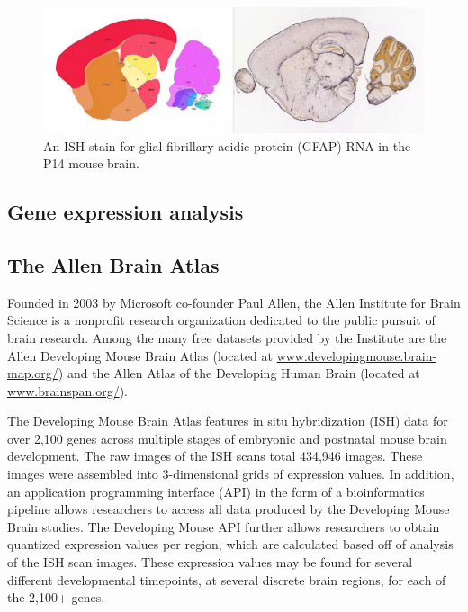 \documentclass[12pt,oneside,onecolumn,a4paper]{article}
\begin{document}
\begin{figure}[h!]
\begin{center}
\includegraphics[width=0.8\columnwidth]{figures/ISH/ISH}
\caption{An ISH stain for glial fibrillary acidic protein (GFAP) RNA in the P14 mouse brain.%
}
\end{center}
\end{figure}

\subsection{Gene expression analysis}


\subsection{The Allen Brain Atlas}
Founded in 2003 by Microsoft co-founder Paul Allen, the Allen Institute for Brain Science is a nonprofit research organization dedicated to the public pursuit of brain research. Among the many free datasets provided by the Institute are the Allen Developing Mouse Brain Atlas (located at \href{http://www.developingmouse.brain-map.org/}{www.developingmouse.brain-map.org/}) and the Allen Atlas of the Developing Human Brain (located at \href{http://www.brainspan.org/}{www.brainspan.org/}).

The Developing Mouse Brain Atlas features in situ hybridization (ISH) data for over 2,100 genes across multiple stages of embryonic and postnatal mouse brain development. The raw images of the ISH scans total 434,946 images. These images were assembled into 3-dimensional grids of expression values.  In addition, an application programming interface (API) in the form of a bioinformatics pipeline allows researchers to access all data produced by the Developing Mouse Brain studies. The Developing Mouse API further allows researchers to obtain quantized expression values per region, which are calculated based off of analysis of the ISH scan images. These expression values may be found for several different developmental timepoints, at several discrete brain regions, for each of the 2,100+ genes. \citep{Thompson_2014}
\end{document}
